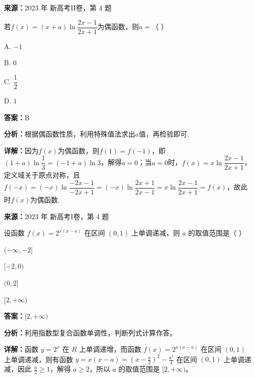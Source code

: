 \begin{question}[points=5]
\textbf{来源：}2023 年 新高考II卷，第 4 题\par
若$f(x)=(x+a)\ln\dfrac{2x-1}{2x+1}$为偶函数，则$a=$（ \quad ）
\begin{choices}
  \item A. $-1$
  \item B. $0$
  \item C. $\dfrac{1}{2}$
  \item D. $1$
\end{choices}
\begin{solution}
\textbf{答案：}B

\textbf{分析：}根据偶函数性质，利用特殊值法求出$a$值，再检验即可.

\textbf{详解：}因为$f(x)$为偶函数，则$f(1)=f(-1)$，即$(1+a)\ln\dfrac{1}{3}=(-1+a)\ln3$，解得$a=0$；当$a=0$时，$f(x)=x\ln\dfrac{2x-1}{2x+1}$，定义域关于原点对称，且$f(-x)=(-x)\ln\dfrac{-2x-1}{-2x+1}=(-x)\ln\dfrac{2x+1}{2x-1}=x\ln\dfrac{2x-1}{2x+1}=f(x)$，故此时$f(x)$为偶函数.
\end{solution}
\end{question}

\begin{question}[points=5]
\textbf{来源：}2023 年 新高考I卷，第 4 题\par
设函数 $f(x)=2^{x(x-a)}$ 在区间 $(0,1)$ 上单调递减，则 $a$ 的取值范围是（ ）
\begin{choices}
  \item $(-\infty,-2]$
  \item $[-2,0)$
  \item $(0,2]$
  \item $[2,+\infty)$
\end{choices}
\begin{solution}
\textbf{答案：}$[2,+\infty)$

\textbf{分析：}利用指数型复合函数单调性，判断列式计算作答。

\textbf{详解：}函数 $y=2^x$ 在 $R$ 上单调递增，而函数 $f(x)=2^{x(x-a)}$ 在区间 $(0,1)$ 上单调递减，则有函数 $y=x(x-a)=(x-\frac{a}{2})^2-\frac{a^2}{4}$ 在区间 $(0,1)$ 上单调递减，因此 $\frac{a}{2}\geq 1$，解得 $a\geq 2$，所以 $a$ 的取值范围是 $[2,+\infty)$。
\end{solution}
\end{question}

